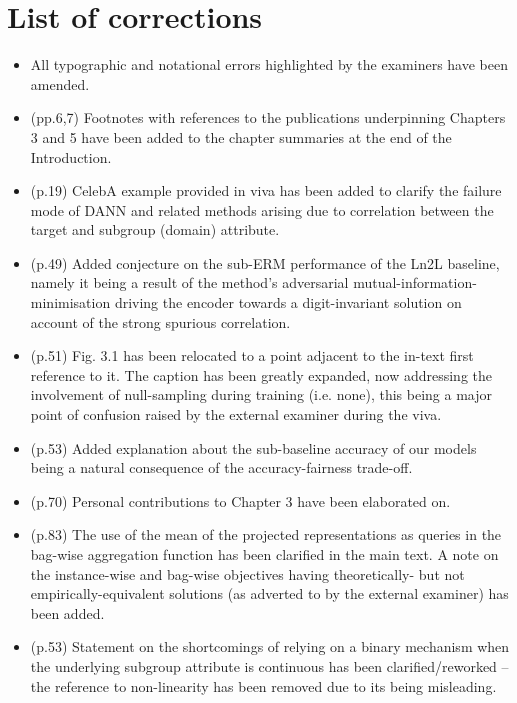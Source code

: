 \section*{List of corrections}
%
\begin{itemize}
    \item All typographic and notational errors highlighted by the examiners have been amended.
    \item (pp.6,7) Footnotes with references to the publications underpinning Chapters 3 and 5 have
        been added to the chapter summaries at the end of the Introduction.
    \item (p.19) CelebA example provided in viva has been added to clarify the failure mode of DANN
        and related methods arising due to correlation between the target and subgroup (domain)
        attribute.
    \item (p.49) Added conjecture on the sub-ERM performance of the Ln2L baseline, namely it being
        a result of the method's adversarial mutual-information-minimisation driving the encoder
        towards a digit-invariant solution on account of the strong spurious correlation.
    \item (p.51) Fig. 3.1 has been relocated to a point adjacent to the in-text first reference to
        it. The caption has been greatly expanded, now addressing the involvement of null-sampling
        during training (i.e. none), this being a major point of confusion raised by the external
        examiner during the viva.
    \item (p.53) Added explanation about the sub-baseline accuracy of our models being a natural
        consequence of the accuracy-fairness trade-off.
    \item (p.70) Personal contributions to Chapter 3 have been elaborated on.
    \item (p.83) The use of the mean of the projected representations as queries in the bag-wise
        aggregation function has been clarified in the main text. A note on the instance-wise and
        bag-wise objectives having theoretically- but not empirically-equivalent solutions (as
        adverted to by the external examiner) has been added.
    \item (p.53) Statement on the shortcomings of relying on a binary mechanism when the underlying
        subgroup attribute is continuous has been clarified/reworked -- the reference to
        non-linearity has been removed due to its being misleading.

\end{itemize}
